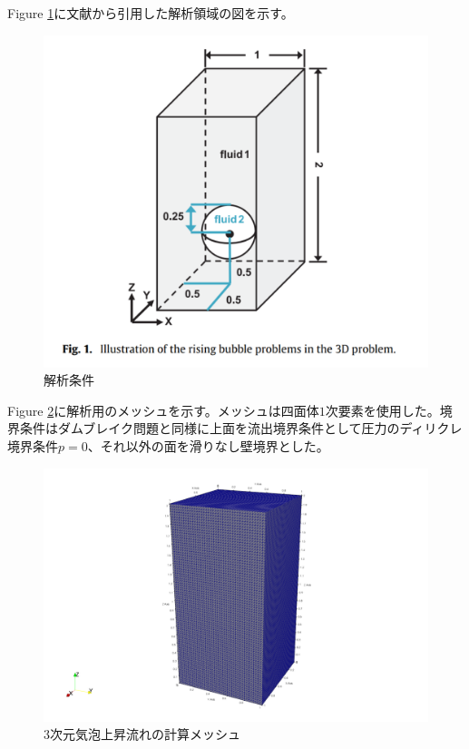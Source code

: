 Figure \ref{fig:3d-bubble-setting}に文献\cite{Safi2017}から引用した解析領域の図を示す。

\begin{figure}[H]
	\centering
	\includegraphics[width=10truecm]{pics/3d-bubble/setting.pdf}
	\caption{解析条件\cite{Safi2017}}
	\label{fig:3d-bubble-setting}
\end{figure}

Figure \ref{fig:3d-bubble-mesh}に解析用のメッシュを示す。メッシュは四面体$1$次要素を使用した。境界条件はダムブレイク問題と同様に上面を流出境界条件として圧力のディリクレ境界条件$p=0$、それ以外の面を滑りなし壁境界とした。

\begin{figure}[H]
	\centering
	\includegraphics[width=10truecm]{pics/3d-bubble/mesh.pdf}
	\caption{3次元気泡上昇流れの計算メッシュ}
	\label{fig:3d-bubble-mesh}
\end{figure}

